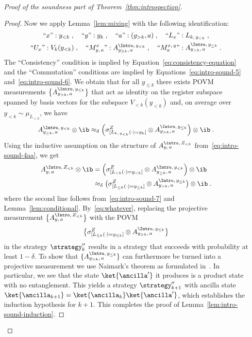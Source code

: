 \begin{proof}[Proof of the soundness part of Theorem~\ref{thm:introspection}]
\begin{proof}
    Now we apply Lemma~\ref{lem:mixing} with the following identification:
    \begin{gather*}
      \text{``$x$''}: y_{< k} \;, \quad
      \text{``$y$''}: y_{k} \;, \quad
      \text{``$a$''}: (y_{> k}, a) \;, \quad
      \text{``$L_x$''}: L_{k,\, y_{<k}} \;,\\
      \text{``$U_x$''}: V_k(y_{< k}) \;, \quad
      \text{``$M^{x}_{y,\, a}$''}: \aigek \;, \quad
      \text{``$M^{x,\, y}_a$''}: \aigk \;.
    \end{gather*}
    The ``Consistency'' condition is implied by
    Equation~\eqref{eq:consistency-equation} and the ``Commutation'' conditions
    are implied by Equations~\eqref{eq:intro-sound-5}
    and~\eqref{eq:intro-sound-6}.
    We obtain that for all $y_{\leq k}$ there exists POVM measurements $\bigl\{
    \aigk \bigr\}$ that act as identity on the register subspace spanned by
    basis vectors for the subspace $V_{< k}(y_{<k})$ and, on average over
    $y_{<k} \sim \mu_{L_{<k}}$, we have
    \begin{equation}\label{eq:intro-sound-7}
      \aigek \otimes \ib
      \approx_\delta \Bigl( \zLk \otimes \aigk  \Bigr)
      \otimes \ib\;.
    \end{equation}
    Using the inductive assumption on the structure of $A^{\intro,\,
      Z_{<k}}_{y,\, a} $ from~\eqref{eq:intro-sound-4aa}, we get
    \begin{align}
      \aizk \otimes \ib
      & = \Bigl( \zLlk \otimes \aigek \Bigr) \otimes \ib \\
      & \approx_\delta \bigl( \zLlek \otimes \aigk \bigr) \otimes \ib\;.
        \label{eq:whatever}
    \end{align}
    where the second line follows from~\eqref{eq:intro-sound-7} and
    Lemma~\ref{lem:conditional}.
    By~\eqref{eq:whatever}, replacing the projective measurement $\bigl\{\aizk
    \bigr\}$ with the POVM
    \begin{equation*}
      \bigl\{\zLlek \otimes \aigk \bigr\}
    \end{equation*}
    in the strategy $\strategy''_k$ results in a strategy that succeeds with
    probability at least $1 - \delta$.
    To show that $\{\aigk\}$ can furthermore be turned into a projective
    measurement we use Naimark's theorem as formulated in~\cite[Theorem
    5.1]{ML20}. In particular, we see that the state
    $\ket{\ancilla'}$ it produces is a product state with no entanglement.
    This yields a strategy $\strategy_{k+1}''$ with ancilla state
    $\ket{\ancilla_{k+1}} = \ket{\ancilla_k}\ket{\ancilla'}$, which establishes
    the induction hypothesis for $k+1$.
    This completes the proof of Lemma~\ref{lem:intro-sound-induction}.
  \end{proof}


\end{proof}

